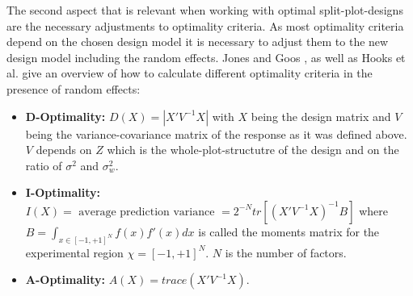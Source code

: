 The second aspect that is relevant when working with optimal split-plot-designs are the necessary adjustments to optimality criteria. As most optimality criteria depend on the chosen design model it is necessary to adjust them to the new design model including the random effects. Jones and Goos \cite{jones:optimalalg}, \cite{jones:ianddoptimal} as well as Hooks et al.  \cite{hooks:optimalityrandomeffects} give an overview of how to calculate different optimality criteria in the presence of random effects:

\begin{itemize}
	\item \textbf{D-Optimality:} $D(X) = |X'V^{-1}X|$ with $X$ being the design matrix and $V$ being the variance-covariance matrix of the response as it was defined above. $V$ depends on $Z$ which is the whole-plot-structutre of the design and on the ratio of $\sigma^2$ and $\sigma^2_w$.
	\item \textbf{I-Optimality:} $I(X) = \text{ average prediction variance } = 2^{-N} tr[(X'V^{-1}X)^{-1}B]$ where $B=\int_{x \in [-1,+1]^N}f(x)f'(x)dx$ is called the moments matrix for the experimental region $\chi = [-1,+1]^N$. $N$ is the number of factors. 
	\item \textbf{A-Optimality:} $A(X) = trace(X'V^{-1}X)$.
\end{itemize}

